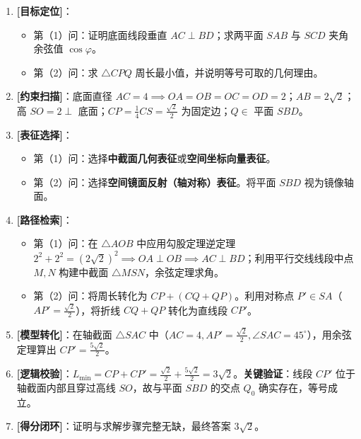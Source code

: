 \documentclass[11pt,a4paper,fontset=fandol]{ctexart}
\begin{document}
\medskip
\begin{tcolorbox}[colback=gray!4,colframe=ink!70,boxrule=0.7pt,arc=1mm,before skip=6pt,after skip=6pt,top=4pt,bottom=4pt,title=\textbf{决策路线}]
\begin{enumerate}[label=\textbf{\arabic*\ },leftmargin=1.8em]
  \item \textbf{[目标定位]}：
    \begin{itemize}
      \item 第（1）问：证明底面线段垂直 \(AC \perp BD\)；求两平面 \(SAB\) 与 \(SCD\) 夹角余弦值 \(\cos\varphi\)。
      \item 第（2）问：求 \(\triangle CPQ\) 周长最小值，并说明等号可取的几何理由。
    \end{itemize}
  \item \textbf{[约束扫描]}：底面直径 \(AC=4 \implies OA=OB=OC=OD=2\)；\(AB=2\sqrt{2}\)；高 \(SO=2 \perp\) 底面；\(CP = \frac{1}{4}CS = \frac{\sqrt{2}}{2}\) 为固定边；\(Q \in\) 平面 \(SBD\)。
  \item \textbf{[表征选择]}：
    \begin{itemize}
      \item 第（1）问：选择\textbf{中截面几何表征}或\textbf{空间坐标向量表征}。
      \item 第（2）问：选择\textbf{空间镜面反射（轴对称）表征}。将平面 \(SBD\) 视为镜像轴面。
    \end{itemize}
  \item \textbf{[路径检索]}：
    \begin{itemize}
      \item 第（1）问：在 \(\triangle AOB\) 中应用勾股定理逆定理 \(2^2+2^2 = (2\sqrt{2})^2 \implies OA \perp OB \implies AC \perp BD\)；利用平行交线线段中点 \(M, N\) 构建中截面 \(\triangle MSN\)，余弦定理求角。
      \item 第（2）问：将周长转化为 \(CP + (CQ + QP)\)。利用对称点 \(P' \in SA\)（\(AP' = \frac{\sqrt{2}}{2}\)），将折线 \(CQ + QP\) 转化为直线段 \(CP'\)。
    \end{itemize}
  \item \textbf{[模型转化]}：在轴截面 \(\triangle SAC\) 中（\(AC=4, AP'=\frac{\sqrt{2}}{2}, \angle SAC=45^\circ\)），用余弦定理算出 \(CP' = \frac{5\sqrt{2}}{2}\)。
  \item \textbf{[逻辑校验]}：\(L_{\min} = CP + CP' = \frac{\sqrt{2}}{2} + \frac{5\sqrt{2}}{2} = 3\sqrt{2}\)。\textbf{关键验证}：线段 \(CP'\) 位于轴截面内部且穿过高线 \(SO\)，故与平面 \(SBD\) 的交点 \(Q_0\) 确实存在，等号成立。
  \item \textbf{[得分闭环]}：证明与求解步骤完整无缺，最终答案 \(3\sqrt{2}\)。
\end{enumerate}
\end{tcolorbox}
\end{document}
